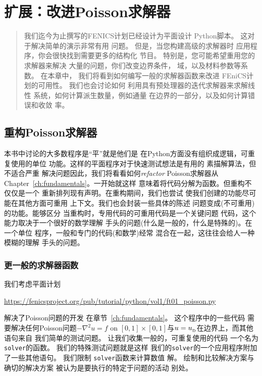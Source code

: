 \chapter{扩展：改进Poisson求解器}
\label{ch:poisson}


\begin{quote}
我们迄今为止撰写的FENICS计划已经设计为平面设计
Python脚本。 这对于解决简单的演示非常有用
问题。 但是，当您构建高级的求解器时
应用程序，你会很快找到需要更多的结构化
节目。 特别是，您可能希望重用您的求解器来解决
大量的问题，你们改变边界条件，
域，以及材料参数等系数。 在本章中，
我们将看到如何编写一般的求解器函数来改进
FEniCS计划的可用性。 我们也会讨论如何
利用具有预处理器的迭代求解器来求解线性
系统，如何计算派生数量，例如通量
在边界的一部分，以及如何计算错误和收敛
率。
\end{quote}

\section{重构Poisson求解器}
\label{ch:poisson0:impl2}


本书中讨论的大多数程序是“平”就是他们是
在Python方面没有组织成逻辑，可重复使用的单位
功能。这样的平面程序对于快速测试想法是有用的
素描解算法，但不适合严重
解决问题因此，我们将看看如何\emph{refactor}
Poisson求解器从Chapter~\ref{ch:fundamentals}。一开始就这样
意味着将代码分解为函数。但重构不仅仅是一个
重新排列现有声明。在重构期间，我们也尝试
使我们创建的功能尽可能在其他方面可重用
上下文。我们也会封装一些具体的陈述
问题变成(不可重用)的功能。能够区分
当重构时，专用代码的可重用代码是一个关键问题
代码，这个能力取决于一个很好的数学理解
手头的问题(什么是一般的，什么是特殊的)。在一个单位
程序，一般和专门的代码(和数学)经常
混合在一起，这往往会给人一种模糊的理解
手头的问题。

\subsection{更一般的求解器函数}
\label{ch:poisson0:impl2:func}

我们考虑平面计划
\begin{center}
\url{https://fenicsproject.org/pub/tutorial/python/vol1/ft01_poisson.py}
\end{center}
解决了Poisson问题的开发
在章节~\ref{ch:fundamentals}。
这个程序中的一些代码
需要解决任何Poisson问题$-\nabla^2 u=f$ on $[0,1]\times
[0,1]$与$u=u_{_\mathrm{D}}$在边界上，而其他语句来自
我们简单的测试问题。 让我们收集一般的，可重复使用的代码
一个名为\texttt{solver}的函数。 我们的特殊测试问题就是这样
我们的\texttt{solver}的一个应用程序附加了一些其他语句。 我们限制
\texttt{solver}函数来计算数值
解。 绘制和比较解决方案与确切的解决方案
被认为是要执行的特定于问题的活动
别处。

